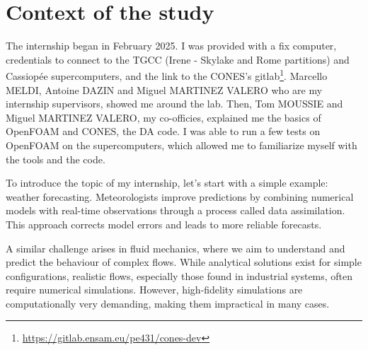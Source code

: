 \chapter{Context of the study} %
\label{chap2}



The internship began in February 2025. I was provided with a fix computer, credentials to connect to the \ac{TGCC} (Irene - Skylake and Rome partitions) and Cassiopée supercomputers, and the link to the \ac{CONES}'s gitlab\footnote{\url{https://gitlab.ensam.eu/pe431/cones-dev}}. Marcello MELDI, Antoine DAZIN and Miguel MARTINEZ VALERO who are my internship supervisors, showed me around the lab.
Then, Tom MOUSSIE and Miguel MARTINEZ VALERO, my co-officies, explained me the basics of \ac{OpenFOAM} and CONES, the DA code. I was able to run a few tests on OpenFOAM on the supercomputers, which allowed me to familiarize myself with the tools and the code.

To introduce the topic of my internship, let's start with a simple example: weather forecasting. Meteorologists improve predictions by combining numerical models with real-time observations through a process called data assimilation. This approach corrects model errors and leads to more reliable forecasts.

A similar challenge arises in fluid mechanics, where we aim to understand and predict the behaviour of complex flows. While analytical solutions exist for simple configurations, realistic flows, especially those found in industrial systems, often require numerical simulations. However, high-fidelity simulations are computationally very demanding, making them impractical in many cases.

